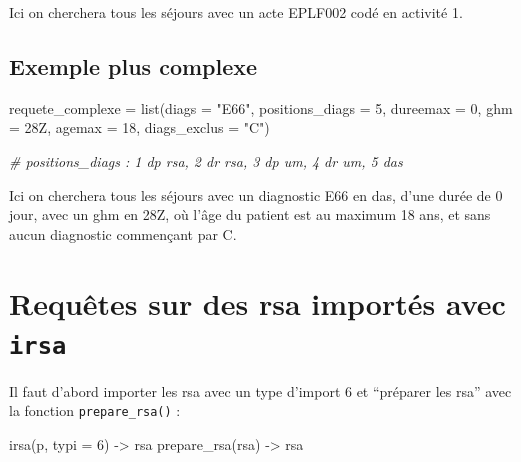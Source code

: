 \documentclass[
]{book}
\newenvironment{Shaded}{\begin{snugshade}}{\end{snugshade}}
\newcommand{\AttributeTok}[1]{\textcolor[rgb]{0.77,0.63,0.00}{#1}}
\newcommand{\CommentTok}[1]{\textcolor[rgb]{0.56,0.35,0.01}{\textit{#1}}}
\newcommand{\DecValTok}[1]{\textcolor[rgb]{0.00,0.00,0.81}{#1}}
\newcommand{\FunctionTok}[1]{\textcolor[rgb]{0.00,0.00,0.00}{#1}}
\newcommand{\NormalTok}[1]{#1}
\newcommand{\OtherTok}[1]{\textcolor[rgb]{0.56,0.35,0.01}{#1}}
\newcommand{\StringTok}[1]{\textcolor[rgb]{0.31,0.60,0.02}{#1}}
\begin{document}
Ici on cherchera tous les séjours avec un acte EPLF002 codé en activité 1.

\hypertarget{exemple-plus-complexe}{%
\subsection{Exemple plus complexe}\label{exemple-plus-complexe}}

\begin{Shaded}
\begin{Highlighting}[]
\NormalTok{requete\_complexe }\OtherTok{=} \FunctionTok{list}\NormalTok{(}\AttributeTok{diags =} \StringTok{"E66"}\NormalTok{, }
                        \AttributeTok{positions\_diags =} \DecValTok{5}\NormalTok{, }
                        \AttributeTok{dureemax =} \DecValTok{0}\NormalTok{,}
                        \AttributeTok{ghm =} \StringTok{\textquotesingle{}28Z\textquotesingle{}}\NormalTok{,}
                        \AttributeTok{agemax =} \DecValTok{18}\NormalTok{,}
                        \AttributeTok{diags\_exclus =} \StringTok{"C"}\NormalTok{)}

\CommentTok{\# positions\_diags : 1 dp rsa, 2 dr rsa, 3 dp um, 4 dr um, 5 das}
\end{Highlighting}
\end{Shaded}

Ici on cherchera tous les séjours avec un diagnostic E66 en das, d'une durée de 0 jour, avec un ghm en 28Z, où l'âge du patient est au maximum 18 ans, et sans aucun diagnostic commençant par C.

\hypertarget{requuxeates-sur-des-rsa-importuxe9s-avec-irsa}{%
\section{\texorpdfstring{Requêtes sur des rsa importés avec \texttt{irsa}}{Requêtes sur des rsa importés avec irsa}}\label{requuxeates-sur-des-rsa-importuxe9s-avec-irsa}}

Il faut d'abord importer les rsa avec un type d'import 6 et ``préparer les rsa'' avec la fonction \texttt{prepare\_rsa()} :

\begin{Shaded}
\begin{Highlighting}[]
\FunctionTok{irsa}\NormalTok{(p, }\AttributeTok{typi =} \DecValTok{6}\NormalTok{) }\OtherTok{{-}\textgreater{}}\NormalTok{ rsa}
\FunctionTok{prepare\_rsa}\NormalTok{(rsa) }\OtherTok{{-}\textgreater{}}\NormalTok{ rsa}
\end{Highlighting}
\end{Shaded}
\end{document}
